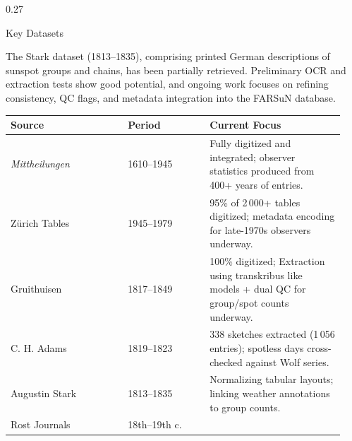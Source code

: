 \documentclass[final]{beamer}
\newcommand{\datasetbox}[2]{%
  \tcbox[colframe=#2,colback=#2!12!white,boxrule=0.6pt,arc=2mm,left=4mm,right=4mm,top=1mm,bottom=1mm]{\textbf{#1}}%
}
\newenvironment{tightblock}[1]{%
  \begin{block}{#1}\vspace{0.6em}
}{\vspace{0.6em}\end{block}}
\begin{document}
\begin{frame}[t]
\begin{columns}[t,totalwidth=0.98\paperwidth]
\begin{column}{0.27\paperwidth}
\begin{tightblock}{Key Datasets}
\datasetbox{Augustin Stark Data}{codered}
The Stark dataset (1813–1835), comprising printed German descriptions of sunspot groups and chains, has been partially retrieved. Preliminary OCR and extraction tests show good potential, and ongoing work focuses on refining consistency, QC flags, and metadata integration into the FARSuN database. \\
\vspace{0.9em}
\begin{tabular}{@{}p{0.33\linewidth}p{0.23\linewidth}p{0.38\linewidth}@{}}
\toprule
\textbf{Source} & \textbf{Period} & \textbf{Current Focus} \\ \midrule
\emph{Mittheilungen} & 1610--1945 & Fully digitized and integrated; observer statistics produced from 400+ years of entries. \\
Zürich Tables & 1945--1979 & 95\% of 2\,000+ tables digitized; metadata encoding for late-1970s observers underway. \\
Gruithuisen & 1817--1849 & 100\% digitized; Extraction using transkribus like models + dual QC for group/spot counts underway. \\
C. H. Adams & 1819--1823 & 338 sketches extracted (1\,056 entries); spotless days cross-checked against Wolf series. \\
Augustin Stark & 1813--1835 & Normalizing tabular layouts; linking weather annotations to group counts. \\
Rost Journals & 18th--19th c. &  \\
\bottomrule
\end{tabular}
\end{tightblock}


\end{column}
\end{columns}
\end{frame}
\end{document}
